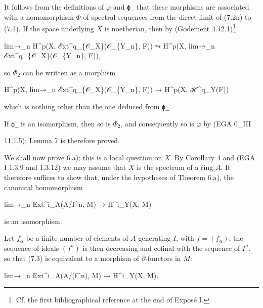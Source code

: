\documentclass[
]{article}
\newenvironment{Shaded}{}{}
\newcommand{\NormalTok}[1]{#1}
\begin{document}
It follows from the definitions of \(\varphi\) and \texttt{ϕ̲} that these
morphisms are associated with a homomorphism \(\Phi\) of spectral
sequences from the direct limit of (7.2n) to (7.1). If the space
underlying \(X\) is noetherian, then by (Godement 4.12.1)\footnote{Cf.
  the first bibliographical reference at the end of Exposé I.}

\begin{Shaded}
\begin{Highlighting}[]
\NormalTok{lim→\_n H\^{}p(X, ℰxt\^{}q\_\{𝒪\_X\}(𝒪\_\{Y\_n\}, F)) ⥲ H\^{}p(X, lim→\_n ℰxt\^{}q\_\{𝒪\_X\}(𝒪\_\{Y\_n\}, F)),}
\end{Highlighting}
\end{Shaded}

so \(\Phi_{2}\) can be written as a morphism

\begin{Shaded}
\begin{Highlighting}[]
\NormalTok{H\^{}p(X, lim→\_n ℰxt\^{}q\_\{𝒪\_X\}(𝒪\_\{Y\_n\}, F)) → H\^{}p(X, ℋ\^{}q\_Y(F))}
\end{Highlighting}
\end{Shaded}

which is nothing other than the one deduced from \texttt{ϕ̲}.

If \texttt{ϕ̲} is an isomorphism, then so is \(\Phi_{2}\), and
consequently so is \(\varphi\) by (EGA 0\_III

11.1.5); Lemma 7 is therefore proved.

We shall now prove 6.a); this is a local question on \(X\). By Corollary
4 and (EGA I 1.3.9 and 1.3.12) we may assume that \(X\) is the spectrum
of a ring \(A\). It therefore suffices to show that, under the
hypotheses of Theorem 6.a), the canonical homomorphism

\begin{Shaded}
\begin{Highlighting}[]
\NormalTok{lim→\_n Ext\^{}i\_A(A/I\^{}n, M) → H\^{}i\_Y(X, M)}
\end{Highlighting}
\end{Shaded}

is an isomorphism.

Let \(f_{\alpha}\) be a finite number of elements of \(A\) generating
\(I\), with \(f = (f_{\alpha})\); the sequence of ideals \((f^{n})\) is
then decreasing and cofinal with the sequence of \(I^{n}\), so that
(7.3) is equivalent to a morphism of \(\partial\)-functors in \(M\):

\begin{Shaded}
\begin{Highlighting}[]
\NormalTok{lim→\_n Ext\^{}i\_A(A/(f\^{}n), M) → H\^{}i\_Y(X, M).}
\end{Highlighting}
\end{Shaded}
\end{document}

